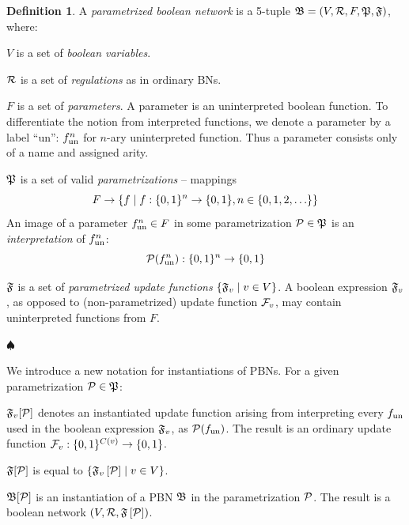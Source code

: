 \documentclass[
	digital, oneside, nosansbold, nocolorbold, nolot, nolof
]{fithesis4}
\theoremstyle{definition}
\newtheorem{definition}{Definition}
\theoremstyle{definition}
\newenvironment{ldefinition}
    {\begin{definition}}
	{\par\hspace{\stretch{1}}$\spadesuit$\hspace{\stretch{1}}
     \par\end{definition}}
\DeclarePairedDelimiter{\set}{\{}{\}}
\begin{document}
\begin{ldefinition}
A \emph{parametrized boolean network} is a 5-tuple
$\mathfrak{B} = (V, \mathcal{R}, F, \mathfrak{P}, \mathfrak{F})$, where:
\begin{description}
    \item $V$ is a set of \emph{boolean variables}.
    \item $\mathcal{R}$ is a set of \emph{regulations} as in ordinary BNs.
    \item $F$ is a set of \emph{parameters}. A parameter is an uninterpreted
        boolean function. To differentiate the notion from interpreted
        functions, we denote a parameter by a label \enquote{un}: $f_{\textrm{un}}^{n}$
        for $n$-ary uninterpreted function. Thus a parameter consists only
        of a name and assigned arity.
    \item $\mathfrak{P}$ is a set of valid \emph{parametrizations} -- mappings
        \[
            F \to \set*{ f \mid f : \set{0,1}^n \to \set{0,1},
                n \in \set{0, 1, 2, \ldots} }
        \]
        An image of a parameter $f_{\textrm{un}}^{n} \in F$ in some parametrization
        $\mathcal{P} \in \mathfrak{P}$ is an \emph{interpretation} of
        $f_{\textrm{un}}^{n}$:
        \[
            \paron{P}(\unf{f}^{n}): \set{0, 1}^n \to \set{0, 1}
        \]
    \item $\mathfrak{F}$ is a set of \emph{parametrized update functions} $\set*{
        \PBNUFs{F}_v \mid v \in V }$. A boolean expression $\mathfrak{F}_v$, as
        opposed to (non-parametrized) update function $\mathcal{F}_v$, may
        contain uninterpreted functions from $F$.
\end{description}
\end{ldefinition}

We introduce a new notation for instantiations of PBNs. For a given
parametrization $\mathcal{P} \in \mathfrak{P}$:
\begin{description}
    \item $\mathfrak{F}_v[\mathcal{P}]$ denotes an instantiated
        update function arising from interpreting every $f_{\textrm{un}}$ used in the
        boolean expression $\mathfrak{F}_v$, as $\mathcal{P}(f_{\textrm{un}})$.
        The result is an ordinary update function $\BNUFs{F}_v : \set{0,
        1}^{C(v)} \to \set{0, 1}$.
    \item $\mathfrak{F}[\mathcal{P}]$ is equal to $\set{
        \PBNUFs{F}_v\left[\paron{P}\right] \mid v \in V }$.
    \item $\mathfrak{B}[\mathcal{P}]$ is an instantiation of a PBN
        $\mathfrak{B}$ in the parametrization $\mathcal{P}$. The result is a boolean
        network $\left(V, \mathcal{R}, \mathfrak{F}\left[\mathcal{P}\right]\right)$.
\end{description}
\end{document}
